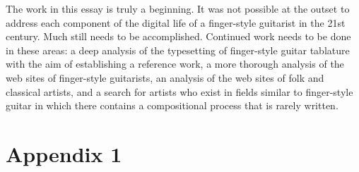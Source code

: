 \documentclass[unicode,hyperfootnotes=false,xetex,colorlinks=true,nofonts,nobib]{tufte-handout}
\begin{document}
The work in this essay is truly a beginning. It was not possible at
the outset to address each component of the digital life of a
finger-style guitarist in the 21st century. Much still needs to be
accomplished. Continued work needs to be done in these areas: a deep
analysis of the typesetting of finger-style guitar tablature with the
aim of establishing a reference work, a more thorough analysis of the
web sites of finger-style guitarists, an analysis of the web sites of
folk and classical artists, and a search for artists who exist in
fields similar to finger-style guitar in which there contains a
compositional process that is rarely written.

\nocite{alexAnderson,alexDeGrassi,andrewWhite,andyMcKee,billyMcLaughlin,adamRafferty,calumGraham,cliveCarroll,craigDAndrea,evaAtmatzidou,ewanDobson,garethPearson,happyTraum,ianEthanCase,janetFeder,jimmyWahlsteen,jonGomm,kakiKing,kellyValleau,kevinHorrigan,leoKottke,lucaStricagnoli,lucasMich,masaakiKishibe,michaelChap,michaelGul,mikeDawes,murielAnders,peppino,peterCiluzzi,peterFinger,pierre,rayMontford,pino,spencerElliot,sunghaJung,thomasLeeb,timSparks,tommyEmmanuel,trevorGH,vickiGenfan}
% 
% 
\printbibliography
\clearpage

\section{Appendix 1}
\label{sec:appendix-1}
\end{document}
